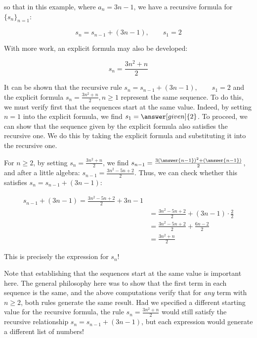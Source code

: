 \documentclass{ximera}
\begin{document}
\begin{example}
\begin{example}
\begin{explanation}
\begin{image}
  \end{image}
so that in this example, where $a_n = 3n-1$, we have a recursive formula for $\{s_n\}_{n=1}$:

\[
s_n = s_{n-1} + (3n-1), \qquad s_1 =2
\]  

With more work, an explicit formula may also be developed:

\[
s_n = \frac{3n^2+n}{2}
\]
    
\end{explanation}
\end{example}   
\end{example}

\begin{remark}
It can be shown that the recursive rule $s_n = s_{n-1} + (3n-1), \qquad s_1 =2$ and the explicit formula $s_n = \frac{3n^2+n}{2}
, n \geq 1$ represent the same sequence.  To do this, we must verify first that the sequences start at the same value.  Indeed, by setting $n=1$ into the explicit formula, we find $s_1 = \answer[given]{2}$.  To proceed, we can show that the sequence given by the explicit formula also satisfies the recursive one.  We do this by taking the explicit formula and substituting it into the recursive one.  

For $n \geq 2$, by setting $s_n = \frac{3n^2+n}{2}$, we find $s_{n-1} = \frac{3(\answer{n-1})^2+(\answer{n-1})}{2}$, and after a little algebra: $s_{n-1} = \frac{3n^2-5n+2}{2}$.  Thus, we can check whether this satisfies $s_n = s_{n-1} + (3n-1)$:

\begin{align*}
 s_{n-1} + (3n-1) = \frac{3n^2-5n+2}{2} +3n-1 \\
 &=  \frac{3n^2-5n+2}{2} +(3n-1) \cdot \frac{2}{2} \\ 
 &= \frac{3n^2-5n+2}{2} + \frac{6n-2}{2} \\
 &= \frac{3n^2+n}{2} 
\end{align*}

This is precisely the expression for $s_n$!

Note that establishing that the sequences start at the same value is important here.  The general philosophy here was to show that the first term in each sequence is the same, and the above computations verify that for \emph{any} term with $n \geq 2$, both rules generate the same result.  Had we specified a different starting value for the recursive formula, the rule $s_n = \frac{3n^2+n}{2}$ would still satisfy the recursive relationship $s_n = s_{n-1} + (3n-1)$, but each expression would generate a different list of numbers!

\end{remark}
\end{document}
